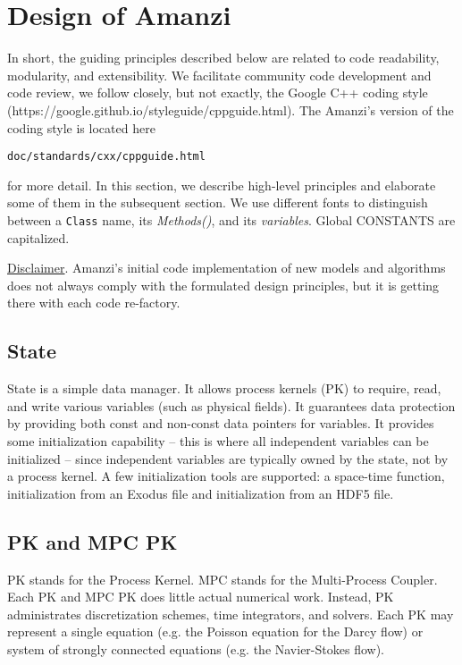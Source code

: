 
\section{Design of Amanzi}

In short, the guiding  principles described below are related to code readability,
modularity, and extensibility.
We facilitate community code development and code review, we follow closely, but not exactly, 
the Google C++ coding style (https://google.github.io/styleguide/cppguide.html). 
The Amanzi's version of the coding style is located here
\begin{center}
{\tt doc/standards/cxx/cppguide.html}
\end{center}

for more detail.
In this section, we describe high-level principles and elaborate some of them 
in the subsequent section.
We use different fonts to distinguish between a {\tt Class} name, its {\it Methods()}, 
and its {\it variables}. 
Global {\rm CONSTANTS} are capitalized.

\underline{Disclaimer}. Amanzi's initial code implementation of new models 
and algorithms does not always comply with the formulated design principles, but 
it is getting there with each code re-factory.


\subsection{State}
State is a simple data manager. 
It allows process kernels (PK) to require, read, and write various variables (such as physical fields).
It guarantees data protection by providing both const and non-const data pointers for variables.
It provides some initialization capability -- this is where all independent variables can be 
initialized -- since independent variables are typically owned by the state, not by a process kernel.
A few initialization tools are supported: a space-time function, initialization from an Exodus file 
and initialization from an HDF5 file.



\subsection{PK and MPC PK}
PK stands for the Process Kernel.
MPC stands for the Multi-Process Coupler.
Each PK and MPC PK does little actual numerical work.
Instead, PK administrates discretization schemes, time integrators, and solvers. 
Each PK may represent a single equation (e.g. the Poisson equation for the Darcy flow) 
or system of strongly connected equations (e.g. the Navier-Stokes flow).

